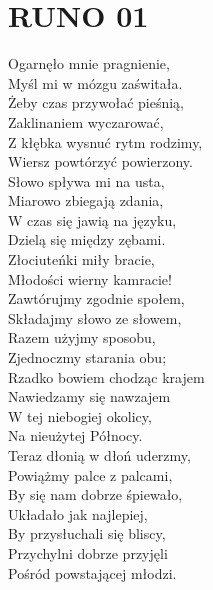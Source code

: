 \section{RUNO 01}

Ogarnęło mnie pragnienie,\\
Myśl mi w mózgu zaświtała.\\
Żeby czas przywołać pieśnią,\\
Zaklinaniem wyczarować,\\
Z kłębka wysnuć rytm rodzimy,\\
Wiersz powtórzyć powierzony.\\
Słowo spływa mi na usta,\\
Miarowo zbiegają zdania,\\
W czas się jawią na języku,\\
Dzielą się między zębami.\\
Złociuteńki miły bracie,\\
Młodości wierny kamracie!\\
Zawtórujmy zgodnie społem,\\
Składajmy słowo ze słowem,\\
Razem użyjmy sposobu,\\
Zjednoczmy starania obu;\\
Rzadko bowiem chodząc krajem\\
Nawiedzamy się nawzajem\\
W tej niebogiej okolicy,\\
Na nieużytej Północy.\\
Teraz dłonią w dłoń uderzmy,\\
Powiążmy palce z palcami,\\
By się nam dobrze śpiewało,\\
Układało jak najlepiej,\\
By przysłuchali się bliscy,\\
Przychylni dobrze przyjęli\\
Pośród powstającej młodzi.\\